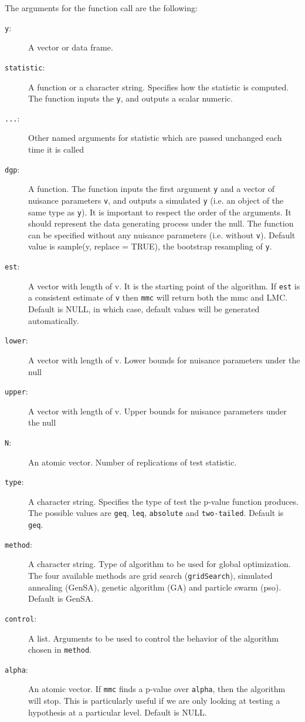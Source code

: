 \documentclass[]{article}\usepackage[]{graphicx}\usepackage[]{color}
\newcommand{\pkg}[1]{{\normalfont\fontseries{b}\selectfont #1}}
\let\code=\texttt
\begin{document}
The arguments for the function call are the following:
\begin{description}
		\item[\code{y}:] A vector or data frame.

		\item[\code{statistic}:] A function or a character string. Specifies how the statistic is computed.
		The function inputs the \code{y}, and outputs a scalar numeric.

		\item[\code{...}:] Other named arguments for statistic which are passed unchanged each time it is
		called

		\item[\code{dgp}:] A function. The function inputs the first argument \code{y} and a vector of
		nuisance parameters \code{v}, and outputs a simulated \code{y} (i.e. an object of the same
		type as \code{y}). It is important to respect the order of the arguments. It should represent the data generating process under the null. The function can be specified without any nuisance parameters (i.e. without \code{v}). Default value is sample(y, replace = TRUE), the bootstrap
		resampling of \code{y}.

		\item[\code{est}:] A vector with length of v. It is the starting point of the algorithm. If \code{est} is a consistent estimate of \code{v} then \code{mmc} will return both the mmc and LMC. Default is NULL, in which case, default values will be generated automatically.

		\item[\code{lower}:] A vector with length of v. Lower bounds for nuisance parameters under the null

		\item[\code{upper}:] A vector with length of v. Upper bounds for nuisance parameters under the null

		\item[\code{N}:] An atomic vector. Number of replications of test statistic.

		\item[\code{type}:] A character string. Specifies the type of test the p-value function
		produces. The possible values are \code{geq}, \code{leq}, \code{absolute} and
		\code{two-tailed}. Default is \code{geq}.

		\item[\code{method}:] A character string. Type of algorithm to be used for global optimization.
		The four available methods are grid search (\code{gridSearch}), simulated annealing (\pkg{GenSA}), genetic algorithm (\pkg{GA}) and particle swarm (\pkg{pso}).
		Default is \pkg{GenSA}.

		\item[\code{control}:] A list. Arguments to be used to control the behavior of the algorithm chosen in \code{method}.

		\item[\code{alpha}:] An atomic vector. If \code{mmc} finds a p-value over \code{alpha}, then the algorithm will stop. This is particularly useful if we are only looking at testing a hypothesis at a particular level. Default is NULL.
\end{description}
\end{document}
